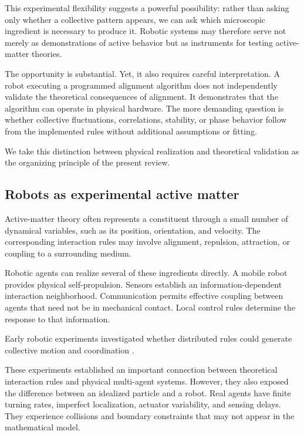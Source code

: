 This experimental flexibility
suggests a powerful possibility:
rather than asking only
whether a collective pattern
appears, we can ask
which microscopic ingredient
is necessary to produce it.
Robotic systems may therefore
serve not merely as
demonstrations of active
behavior but as instruments
for testing active-matter
theories.

The opportunity is substantial.
Yet, it also requires
careful interpretation.
A robot executing a
programmed alignment
algorithm does not
independently validate
the theoretical consequences
of alignment. It
demonstrates that the
algorithm can operate
in physical hardware.
The more demanding
question is whether
collective fluctuations,
correlations, stability,
or phase behavior
follow from the
implemented rules
without additional
assumptions or fitting.

We take this distinction
between physical realization
and theoretical validation
as the organizing principle
of the present review.

\subsection{Robots as experimental active matter}
\label{sec:introduction-robots}

Active-matter theory often represents a constituent
through a small number of dynamical variables,
such as its position, orientation, and velocity.
The corresponding interaction rules may involve
alignment, repulsion, attraction, or coupling
to a surrounding medium.

Robotic agents can realize several of these
ingredients directly. A mobile robot
provides physical self-propulsion.
Sensors establish an information-dependent
interaction neighborhood. Communication
permits effective coupling between agents
that need not be in mechanical contact.
Local control rules determine the response
to that information.

Early robotic experiments investigated
whether distributed rules could generate
collective motion and coordination
\cite{Hayes2003selforganizedflock,Spears2004distributedphysics,Kelly2004ascalableonboard,Belta2004controlofateamof,Mizuguchi2004collectivedynamics,Turgut2008modelingphasetrans,Navarro2008anapproachtoflock,Hamann2008spatialmacroscopic,Miki2010asimplerulebased,Yamada2011circularmotiongene}.

These experiments established an important
connection between theoretical interaction
rules and physical multi-agent systems.
However, they also exposed the difference
between an idealized particle and a robot.
Real agents have finite turning rates,
imperfect localization, actuator
variability, and sensing delays.
They experience collisions and
boundary constraints that may not
appear in the mathematical model.

